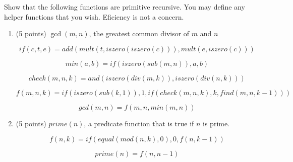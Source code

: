 \documentclass[paper=a4, fontsize=11pt]{scrartcl} %
\begin{document}
\pagebreak

\section{}

\begin{fancyquotes}
  Show that the following functions are primitive recursive.
  You may define any helper functions that you wish.
  Eficiency is not a concern.
\end{fancyquotes}

\begin{enumerate}
\item
  \begin{fancyquotes}
    (5 points) $\gcd(m, n)$, the greatest common divisor of
    $m$ and $n$
  \end{fancyquotes}

  \begin{equation}
    \mathit{if}(c,t,e) = \mathit{add}(\mathit{mult}(t,\mathit{iszero}(\mathit{iszero}(c))), \mathit{mult}(e,\mathit{iszero}(c)))
  \end{equation}

  \begin{equation}
    \mathit{min}(a,b) = \mathit{if}(\mathit{iszero}(\mathit{sub}(m,n)), a, b)
  \end{equation}

  \begin{equation}
    \mathit{check}(m,n,k) = \mathit{and}(\mathit{iszero}(\mathit{div}(m,k)), \mathit{iszero}(\mathit{div}(n,k)))
  \end{equation}

  \begin{equation}
    f(m,n,k) = \mathit{if}(\mathit{iszero}(\mathit{sub}(k,1)), 1, \mathit{if}(\mathit{check}(m,n,k), k, \mathit{find}(m, n, k-1)))
  \end{equation}

  \begin{equation}
    \mathit{gcd}(m,n) = f(m,n,\mathit{min}(m,n))
  \end{equation}

\item
  \begin{fancyquotes}
    (5 points) $\mathit{prime}(n)$, a predicate function that is true
    if $n$ is prime.
  \end{fancyquotes}

  \begin{equation}
    f(n,k) = if(\mathit{equal}(\mathit{mod}(n,k),0), 0, f(n,k-1))
  \end{equation}

  \begin{equation}
    \mathit{prime}(n) = f(n,n-1)
  \end{equation}

\end{enumerate}
\end{document}
